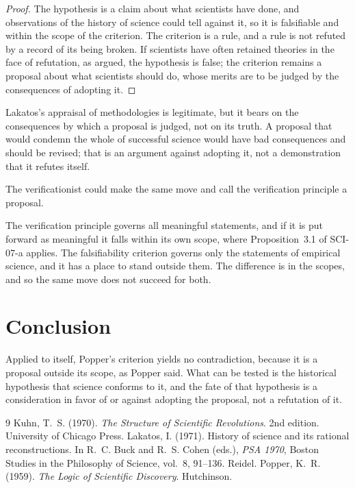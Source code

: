 \documentclass{situationist-preprint}
\begin{document}
\begin{proof}
The hypothesis is a claim about what scientists have done, and observations of the history of science could tell against it, so it is falsifiable and within the scope of the criterion. The criterion is a rule, and a rule is not refuted by a record of its being broken. If scientists have often retained theories in the face of refutation, as \citet{Kuhn1970} argued, the hypothesis is false; the criterion remains a proposal about what scientists should do, whose merits are to be judged by the consequences of adopting it.
\end{proof}

Lakatos's appraisal of methodologies is legitimate, but it bears on the consequences by which a proposal is judged, not on its truth. A proposal that would condemn the whole of successful science would have bad consequences and should be revised; that is an argument against adopting it, not a demonstration that it refutes itself.

\begin{objection}[Verification]
The verificationist could make the same move and call the verification principle a proposal.
\end{objection}

\begin{reply}
The verification principle governs all meaningful statements, and if it is put forward as meaningful it falls within its own scope, where Proposition~3.1 of SCI-07-a applies. The falsifiability criterion governs only the statements of empirical science, and it has a place to stand outside them. The difference is in the scopes, and so the same move does not succeed for both.
\end{reply}

\section{Conclusion}\label{s:conclusion}

Applied to itself, Popper's criterion yields no contradiction, because it is a proposal outside its scope, as Popper said. What can be tested is the historical hypothesis that science conforms to it, and the fate of that hypothesis is a consideration in favor of or against adopting the proposal, not a refutation of it.

\begin{thebibliography}{9}
 Kuhn, T.~S. (1970). \emph{The Structure of Scientific Revolutions}. 2nd edition. University of Chicago Press.
 Lakatos, I. (1971). History of science and its rational reconstructions. In R.~C. Buck and R.~S. Cohen (eds.), \emph{PSA 1970}, Boston Studies in the Philosophy of Science, vol.~8, 91--136. Reidel.
 Popper, K.~R. (1959). \emph{The Logic of Scientific Discovery}. Hutchinson.
\end{thebibliography}
\end{document}
